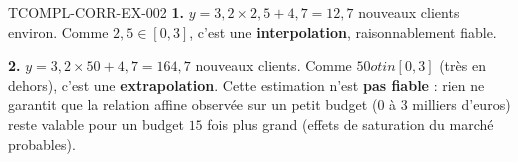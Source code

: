 \begin{corrige}{TCOMPL-CORR-EX-002}
\textbf{1.} $y = 3{,}2\times2{,}5+4{,}7 = 12{,}7$ nouveaux clients environ. Comme $2{,}5\in[0,3]$, c'est une \textbf{interpolation}, raisonnablement fiable.

\textbf{2.} $y = 3{,}2\times50+4{,}7 = 164{,}7$ nouveaux clients. Comme $50 
otin [0,3]$ (très en dehors), c'est une \textbf{extrapolation}. Cette estimation n'est \textbf{pas fiable} : rien ne garantit que la relation affine observée sur un petit budget ($0$ à $3$ milliers d'euros) reste valable pour un budget $15$ fois plus grand (effets de saturation du marché probables).
\end{corrige}
